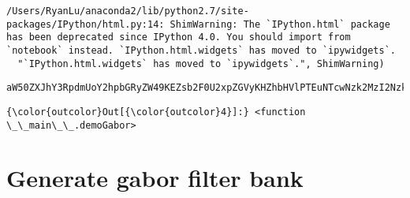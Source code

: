 \documentclass[11pt]{article}
\begin{document}
    \begin{Verbatim}[commandchars=\\\{\}]
/Users/RyanLu/anaconda2/lib/python2.7/site-packages/IPython/html.py:14: ShimWarning: The `IPython.html` package has been deprecated since IPython 4.0. You should import from `notebook` instead. `IPython.html.widgets` has moved to `ipywidgets`.
  "`IPython.html.widgets` has moved to `ipywidgets`.", ShimWarning)

    \end{Verbatim}

    
    \begin{verbatim}
aW50ZXJhY3RpdmUoY2hpbGRyZW49KEZsb2F0U2xpZGVyKHZhbHVlPTEuNTcwNzk2MzI2Nzk0ODk2NiwgZGVzY3JpcHRpb249dSd0aGV0YScsIG1heD0zLjE0MTU5MjY1MzU4OTc5Mywgc3RlcD3igKY=

    \end{verbatim}

    
\begin{Verbatim}[commandchars=\\\{\}]
{\color{outcolor}Out[{\color{outcolor}4}]:} <function \_\_main\_\_.demoGabor>
\end{Verbatim}
            
    \section{Generate gabor filter bank}\label{generate-gabor-filter-bank}
\end{document}

